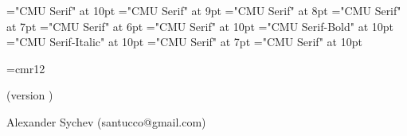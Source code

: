 \font\tenrm="CMU Serif" at 10pt \tenrm
\font\ninerm="CMU Serif" at 9pt \ninerm
\font\eightrm="CMU Serif" at 8pt \eightrm 
\font\sevenrm="CMU Serif" at 7pt \sevenrm
\font\sixrm="CMU Serif" at 6pt \sixrm
\font\tentex="CMU Serif" at 10pt \tentex
\font\tenbf="CMU Serif-Bold" at 10pt \tenbf 
\font\tenit="CMU Serif-Italic" at 10pt \tenit 
\font\titlefont="CMU Serif" at 7pt   \titlefont 
\font\ttitlefont="CMU Serif" at 10pt  \ttitlefont

\def\As{\note{Также смотри секции}} %
\def\U{\note{Используется в секции}} %
\def\Us{\note{Используется в секциях}} %
\def\A{\note{Также смотри секцию}} %
\def\ET{ и~} %
\def\ETs{, и~} %
\def\fin{\par\vfill\eject %
  \ifpagesaved\null\vfill\eject\fi %
  \if L\lr\else\null\vfill\eject\fi %
  \parfillskip 0pt plus 1fil
  \def\grouptitle{НАЗВАНИЯ СЕКЦИЙ}
  \let\topsecno=\nullsec
  \message{Названия секций:}
  \output={\normaloutput\page\lheader\rheader}
  \setpage
  \def\note##1##2.{\quad{\eightrm##1~\ifacro{\pdfnote##2.}\else{##2}\fi.}}
  \def\Q{\note{Расположено в секции}} %
  \def\Qs{\note{Расположено в секциях}} %
  \def\U{\note{Используется в секции}} %
  \def\Us{\note{Используется в секциях}} %
  \def\I{\par\hangindent 2em}\let\*=*
  \def\outsecname{Названия секций}
  \ifacro \let\Xpdf\X
  \ifpdftex \makebookmarks \pdfdest name {NOS} fitb
    \pdfoutline goto name {NOS} count -\secno {\outsecname}
    \def\X##1:##2\X{\Xpdf##1:##2\X \firstsecno##1.%
      {\toksF={}\makeoutlinetoks##2\outlinedone\outlinedone}%
      \pdfoutline goto num \the\toksA \expandafter{\the\toksE}}
  \else\ifpdf
    \special{pdf: outline -1 << /Title (\outsecname)
      /Dest [ @thispage /FitH @ypos ] >>}
    \def\X##1:##2\X{\Xpdf##1:##2\X \firstsecno##1.%
      {\toksF={}\makeoutlinetoks##2\outlinedone\outlinedone}%
      \special{pdf: outline 0 << /Title (\the\toksE)
        /A << /S /GoTo /D (\romannumeral\the\toksA) >> >>}}
  \fi\fi\fi
  \readsections}


\font\authorfont=cmr12
 \titletrue\eject
\null\vfill
\centerline{\stitle}
\vskip 10pt\centerline{(version \ver)}
\vskip 24pt
\centerline{\authorfont Alexander Sychev (santucco@gmail.com)}
\vfill

